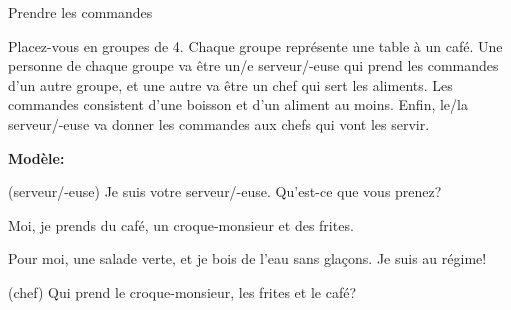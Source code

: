 \begin{frame}{Prendre les commandes}

  {\small Placez-vous en groupes de 4.
  Chaque groupe représente une table à un café.
  Une personne de chaque groupe va être un/e serveur/-euse qui prend les commandes d'un autre groupe, et une autre va être un chef qui sert les aliments.
  Les commandes consistent d'une \alert{boisson} et d'un \alert{aliment} au moins.
  Enfin, le/la serveur/-euse va donner les commandes aux chefs qui vont les servir.} \\

  \begin{description}
    \small
    \item[] \textbf{Modèle:}
    \item[E1:] (serveur/-euse) Je suis votre serveur/-euse. Qu'est-ce que vous prenez?
    \item[E2:] Moi, je prends du café, un croque-monsieur et des frites.
    \item[E3:] Pour moi, une salade verte, et je bois de l'eau sans glaçons. Je suis au régime!
    \item[E4:] (chef) Qui prend le croque-monsieur, les frites et le café?
  \end{description}
\end{frame}